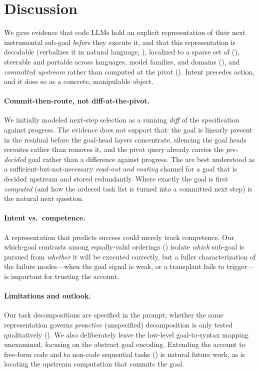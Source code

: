 \section{Discussion}
\label{sec:conclusion}

We gave evidence that code LLMs hold an explicit representation of their next instrumental sub-goal
\emph{before} they execute it, and that this representation is decodable (\goalscope verbalizes it in
natural language, ), localized to a sparse set of \goalheads (),
steerable and portable across languages, model families, and domains (), and
\emph{committed upstream} rather than computed at the pivot (). Intent precedes
action, and it does so as a concrete, manipulable object.

\paragraph{Commit-then-route, not diff-at-the-pivot.} We initially modeled next-step selection as a
running \emph{diff} of the specification against progress. The evidence does not support that: the goal
is linearly present in the residual before the goal-head layers concentrate, silencing the goal heads
reroutes rather than removes it, and the pivot query already carries the \emph{pre-decided} goal rather
than a difference against progress. The \goalheads are best understood as a sufficient-but-not-necessary
\emph{read-out and routing} channel for a goal that is decided upstream and stored redundantly. Where
exactly the goal is first \emph{computed} (and how the ordered task list is turned into a committed next
step) is the natural next question.

\paragraph{Intent vs.\ competence.} A representation that predicts success could merely track competence.
Our which-goal contrasts among equally-valid orderings () isolate
\emph{which} sub-goal is pursued from \emph{whether} it will be executed correctly, but a fuller
characterization of the failure modes---when the goal signal is weak, or a transplant fails to
trigger---is important for trusting the account.

\paragraph{Limitations and outlook.} Our task decompositions are specified in the prompt; whether the
same representation governs \emph{proactive} (unspecified) decomposition is only tested qualitatively
(). We also deliberately leave the low-level goal-to-syntax mapping unexamined,
focusing on the abstract goal encoding. Extending the account to free-form code and to non-code
sequential tasks () is natural future work, as is locating the upstream
computation that commits the goal.
